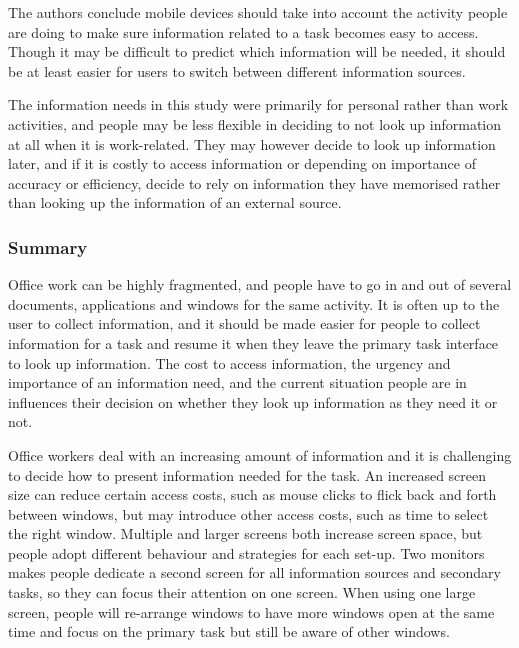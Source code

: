 The authors conclude mobile devices should take into account the activity people are doing to make sure information related to a task becomes easy to access. Though it may be difficult to predict which information will be needed, it should be at least easier for users to switch between different information sources.

The information needs in this study were primarily for personal rather than work activities, and people may be less flexible in deciding to not look up information at all when it is work-related. They may however decide to look up information later, and if it is costly to access information or depending on importance of accuracy or efficiency, decide to rely on information they have memorised rather than looking up the information of an external source. 

\subsubsection{Summary}
Office work can be highly fragmented, and people have to go in and out of several documents, applications and windows for the same activity. It is often up to the user to collect information, and it should be made easier for people to collect information for a task and resume it when they leave the primary task interface to look up information. The cost to access information, the urgency and importance of an information need, and the current situation people are in influences their decision on whether they look up information as they need it or not. 

Office workers deal with an increasing amount of information and it is challenging to decide how to present information needed for the task. An increased screen size can reduce certain access costs, such as mouse clicks to flick back and forth between windows, but may introduce other access costs, such as time to select the right window. 
Multiple and larger screens both increase screen space, but people adopt different behaviour and strategies for each set-up. Two monitors makes people dedicate a second screen for all information sources and secondary tasks, so they can focus their attention on one screen. When using one large screen, people will re-arrange windows to have more windows open at the same time and focus on the primary task but still be aware of other windows. 

